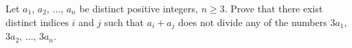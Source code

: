Let $ a_1$,  $ a_2$,  $ \ldots$,  $ a_n$ be distinct positive integers, $ n\ge 3$. Prove that there exist distinct indices $ i$ and $ j$ such that $ a_i + a_j$ does not divide any of the numbers $ 3a_1$,  $ 3a_2$,  $ \ldots$,  $ 3a_n$.